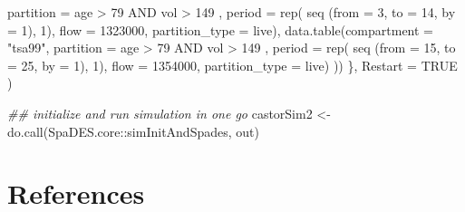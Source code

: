 \documentclass[
  letterpaper,
  DIV=11,
  numbers=noendperiod]{scrreprt}
\newenvironment{Shaded}{\begin{snugshade}}{\end{snugshade}}
\newcommand{\AttributeTok}[1]{\textcolor[rgb]{0.40,0.45,0.13}{#1}}
\newcommand{\ConstantTok}[1]{\textcolor[rgb]{0.56,0.35,0.01}{#1}}
\newcommand{\DecValTok}[1]{\textcolor[rgb]{0.68,0.00,0.00}{#1}}
\newcommand{\DocumentationTok}[1]{\textcolor[rgb]{0.37,0.37,0.37}{\textit{#1}}}
\newcommand{\FunctionTok}[1]{\textcolor[rgb]{0.28,0.35,0.67}{#1}}
\newcommand{\NormalTok}[1]{\textcolor[rgb]{0.00,0.23,0.31}{#1}}
\newcommand{\OtherTok}[1]{\textcolor[rgb]{0.00,0.23,0.31}{#1}}
\newcommand{\SpecialCharTok}[1]{\textcolor[rgb]{0.37,0.37,0.37}{#1}}
\newcommand{\StringTok}[1]{\textcolor[rgb]{0.13,0.47,0.30}{#1}}
\newlength{\cslhangindent}
\newenvironment{CSLReferences}[2] %
 {\begin{list}{}{%
  \setlength{\itemindent}{0pt}
  \setlength{\leftmargin}{0pt}
  \setlength{\parsep}{0pt}
  \ifodd #1
   \setlength{\leftmargin}{\cslhangindent}
   \setlength{\itemindent}{-1\cslhangindent}
  \fi
  \setlength{\itemsep}{#2\baselineskip}}}
 {\end{list}}
\begin{document}
\begin{Shaded}
\begin{Highlighting}[]
                              \AttributeTok{partition =} \StringTok{\textquotesingle{} age \textgreater{} 79 AND vol \textgreater{} 149 \textquotesingle{}}\NormalTok{, }
                              \AttributeTok{period =} \FunctionTok{rep}\NormalTok{( }\FunctionTok{seq}\NormalTok{ (}\AttributeTok{from =} \DecValTok{3}\NormalTok{,}
                                                 \AttributeTok{to =} \DecValTok{14}\NormalTok{, }
                                                 \AttributeTok{by =} \DecValTok{1}\NormalTok{),}
                                            \DecValTok{1}\NormalTok{), }
                              \AttributeTok{flow =} \DecValTok{1323000}\NormalTok{, }
                              \AttributeTok{partition\_type =} \StringTok{\textquotesingle{}live\textquotesingle{}}\NormalTok{),}
                   \FunctionTok{data.table}\NormalTok{(}\AttributeTok{compartment =} \StringTok{"tsa99"}\NormalTok{,}
                              \AttributeTok{partition =} \StringTok{\textquotesingle{} age \textgreater{} 79 AND vol \textgreater{} 149 \textquotesingle{}}\NormalTok{, }
                              \AttributeTok{period =} \FunctionTok{rep}\NormalTok{( }\FunctionTok{seq}\NormalTok{ (}\AttributeTok{from =} \DecValTok{15}\NormalTok{,}
                                                 \AttributeTok{to =} \DecValTok{25}\NormalTok{, }
                                                 \AttributeTok{by =} \DecValTok{1}\NormalTok{),}
                                            \DecValTok{1}\NormalTok{), }
                              \AttributeTok{flow =} \DecValTok{1354000}\NormalTok{, }
                              \AttributeTok{partition\_type =} \StringTok{\textquotesingle{}live\textquotesingle{}}\NormalTok{)  }
\NormalTok{    ))}
\NormalTok{  \},}
  \AttributeTok{Restart =} \ConstantTok{TRUE}
\NormalTok{)}

\DocumentationTok{\#\# initialize and run simulation in one go}
\NormalTok{castorSim2 }\OtherTok{\textless{}{-}} \FunctionTok{do.call}\NormalTok{(SpaDES.core}\SpecialCharTok{::}\NormalTok{simInitAndSpades, out)}
\end{Highlighting}
\end{Shaded}


\chapter*{References}\label{references}


\label{refs}
\begin{CSLReferences}{0}{1}
\end{CSLReferences}
\end{document}
